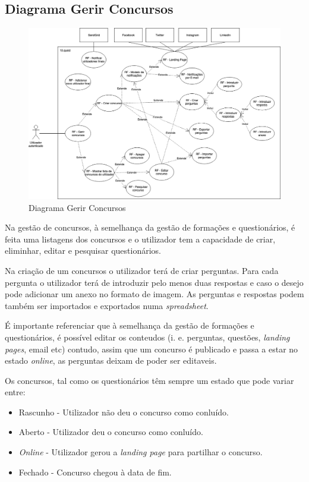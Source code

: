 \subsection{Diagrama Gerir Concursos}
\label{d:concursos}
\begin{figure}[ht!]
	\begin{center}
		\includegraphics[width=1\textwidth]{img/rf/gerir-concurso}
		\caption{Diagrama Gerir Concursos}
		\label{fig:rf-gerir-concursos}
	\end{center}
\end{figure}


Na gestão de concursos, à semelhança da gestão de formações e questionários, é feita uma listagens dos concursos e o utilizador tem a capacidade de criar, eliminhar, editar e pesquisar questionários.

Na criação de um concursos o utilizador terá de criar perguntas. Para cada pergunta o utilizador terá de introduzir pelo menos duas respostas e caso o desejo pode adicionar um anexo no formato de imagem. As perguntas e respostas podem também ser importados e exportados numa \textit{spreadsheet}.

É importante referenciar que à semelhança da gestão de formações e questionários, é possível editar os conteudos (i. e. perguntas, questões, \textit{landing pages}, email etc) contudo, assim que um concurso é publicado e passa a estar no estado \textit{online}, as perguntas deixam de poder ser editaveis. 

Os concursos, tal como os questionários têm sempre um estado que pode variar entre:
\begin{itemize}
	\item Rascunho - Utilizador não deu o concurso como conluído.
	\item Aberto - Utilizador deu o concurso como conluído.
	\item \textit{Online} - Utilizador gerou a \textit{landing page} para partilhar o concurso.
	\item Fechado - Concurso chegou à data de fim.
\end{itemize}


